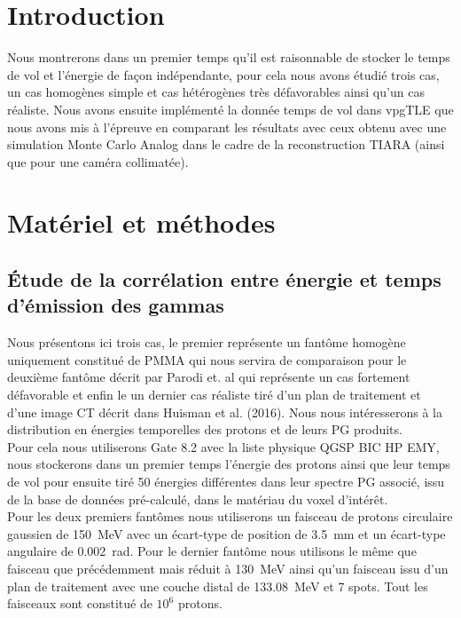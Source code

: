 \documentclass[11pt,a4paper,oldfontcommands]{memoir}
\begin{document}
\section{Introduction}

 Nous montrerons dans un premier temps qu'il est raisonnable de stocker le temps de vol et l’énergie de façon indépendante, pour cela nous avons étudié trois cas, un cas homogènes simple et cas hétérogènes très défavorables ainsi qu'un cas réaliste. Nous avons ensuite implémenté la donnée temps de vol dans vpgTLE que nous avons mis à l'épreuve en comparant les résultats avec ceux obtenu avec une simulation Monte Carlo Analog dans le cadre de la reconstruction TIARA (ainsi que pour une caméra collimatée).

\section{Matériel et méthodes}

\subsection{\'Etude de la corrélation entre énergie et temps d'émission des gammas}

Nous présentons ici trois cas, le premier représente un fantôme homogène uniquement constitué de PMMA qui nous servira de comparaison pour le deuxième fantôme décrit par Parodi et. al \cite{1487723} qui représente un cas fortement défavorable et enfin le un dernier cas réaliste tiré d'un plan de traitement et d'une image CT décrit dans Huisman et al. (2016). Nous nous intéresserons à la distribution en énergies temporelles des protons et de leurs PG produits.\\ Pour cela nous utiliserons Gate 8.2 avec la liste physique QGSP BIC HP EMY, nous stockerons dans un premier temps l'énergie des protons ainsi que leur temps de vol pour ensuite tiré 50 énergies différentes dans leur spectre PG associé, issu de la base de données pré-calculé, dans le matériau du voxel d'intérêt.\\
Pour les deux premiers fantômes nous utiliserons un faisceau de protons circulaire gaussien de 150~MeV avec un écart-type de position de 3.5~mm et un écart-type angulaire de 0.002~rad. Pour le dernier fantôme nous utilisons le même que faisceau que précédemment mais réduit à 130~MeV ainsi qu'un faisceau issu d'un plan de traitement avec une couche distal de 133.08~MeV et 7 spots. Tout les faisceaux sont constitué de $10^6$ protons. 
\end{document}

